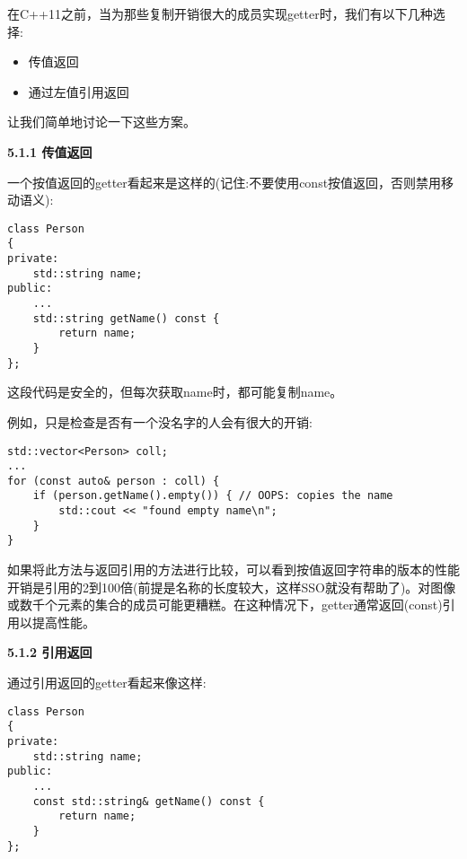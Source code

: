 在C++11之前，当为那些复制开销很大的成员实现getter时，我们有以下几种选择:\par

\begin{itemize}
	\item 传值返回
	\item 通过左值引用返回
\end{itemize}

让我们简单地讨论一下这些方案。\par

\hspace*{\fill} \par %
\textbf{5.1.1 传值返回}

一个按值返回的getter看起来是这样的(记住:不要使用const按值返回，否则禁用移动语义):\par

\begin{lstlisting}[caption={}]
class Person
{
private:
	std::string name;
public:
	...
	std::string getName() const {
		return name;
	}
};
\end{lstlisting}

这段代码是安全的，但每次获取name时，都可能复制name。\par

例如，只是检查是否有一个没名字的人会有很大的开销:\par

\begin{lstlisting}[caption={}]
std::vector<Person> coll;
...
for (const auto& person : coll) {
	if (person.getName().empty()) { // OOPS: copies the name
		std::cout << "found empty name\n";
	}
}
\end{lstlisting}

如果将此方法与返回引用的方法进行比较，可以看到按值返回字符串的版本的性能开销是引用的2到100倍(前提是名称的长度较大，这样SSO就没有帮助了)。对图像或数千个元素的集合的成员可能更糟糕。在这种情况下，getter通常返回(const)引用以提高性能。\par

\hspace*{\fill} \par %
\textbf{5.1.2 引用返回}

通过引用返回的getter看起来像这样:\par

\begin{lstlisting}[caption={}]
class Person
{
private:
	std::string name;
public:
	...
	const std::string& getName() const {
		return name;
	}
};
\end{lstlisting}

